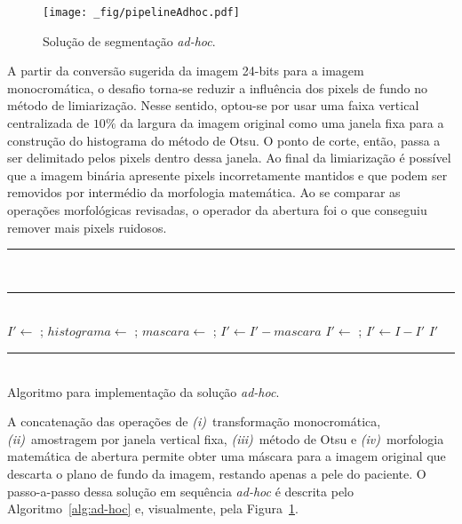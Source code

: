 \begin{figure}[b]
\centering
\texttt{[image: \_fig/pipelineAdhoc.pdf]}
\caption[Solução de segmentação \textit{ad-hoc}]{Solução de segmentação \textit{ad-hoc}.}
\label{fig:systemAdhoc}
\end{figure}

A partir da conversão sugerida da imagem 24-bits para a imagem monocromática, o desafio torna-se reduzir a influência dos pixels de fundo no método de limiarização.
Nesse sentido, optou-se por usar uma faixa vertical centralizada de $10\%$ da largura da imagem original como uma janela fixa para a construção do histograma do método de Otsu.
O ponto de corte, então, passa a ser delimitado pelos pixels dentro dessa janela.
Ao final da limiarização é possível que a imagem binária apresente pixels incorretamente mantidos e que podem ser removidos por intermédio da morfologia matemática.
Ao se comparar as operações morfológicas revisadas, o operador da abertura foi o que conseguiu remover mais pixels ruidosos.

\begin{algorithm}[!b]
\nonl \rule[0.5ex]{410px}{0.5pt}\\
\nonl \rule[0.5ex]{410px}{0.5pt}\\

$I' \leftarrow$ ;
$histograma \leftarrow$ ;
$mascara \leftarrow$ ;
$I' \leftarrow I' - mascara$\;
$I' \leftarrow$ ;
$I' \leftarrow I - I'$\;
\Return $I'$\;
\nonl \rule[0.5ex]{410px}{0.5pt}\\
\caption{Algoritmo para implementação da solução \textit{ad-hoc}.}
\label{alg:ad-hoc}
\end{algorithm}

A concatenação das operações de 
\textit{(i)}~transformação monocromática,
\textit{(ii)}~amostragem por janela vertical fixa,
\textit{(iii)}~método de Otsu e 
\textit{(iv)}~morfologia matemática de abertura permite obter uma máscara para a imagem original que descarta o plano de fundo da imagem, restando apenas a pele do paciente.
O passo-a-passo dessa solução em sequência \textit{ad-hoc} é descrita pelo Algoritmo~\ref{alg:ad-hoc} e, visualmente, pela Figura~\ref{fig:systemAdhoc}.



